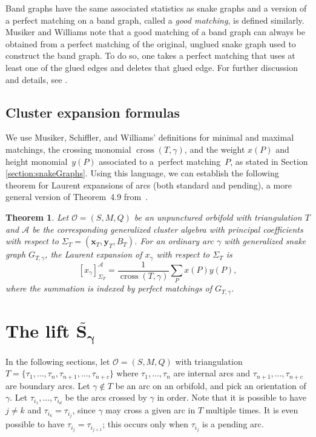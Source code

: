 \documentclass[11pt]{article}
\numberwithin{equation}{section}
\newtheorem{Theorem}{Theorem}[section]
\begin{document}
Band graphs have the same associated statistics as snake graphs and a version of a perfect matching on a band graph, called a \emph{good matching}, is defined similarly. Musiker and Williams note that a good matching of a band graph can always be obtained from a perfect matching of the original, unglued snake graph used to construct the band graph. To do so, one takes a perfect matching that uses at least one of the glued edges and deletes that glued edge. For further discussion and details, see \cite[Section~3]{MW}.

\subsection{Cluster expansion formulas}

We use Musiker, Schiffler, and Williams' definitions for minimal and maximal matchings, the crossing monomial $\operatorname{cross}(T,\gamma)$, and the weight $x(P)$ and height monomial~$y(P)$ associated to a~perfect matching~$P$, as stated in Section \ref{section:snakeGraphs}. Using this language, we can establish the following theorem for Laurent expansions of arcs (both standard and pending), a more general version of Theorem~4.9 from~\cite{MSW}.

\begin{Theorem}\label{Thm:GenSnake+}
Let $\mathcal{O} = (S,M,Q)$ be an unpunctured orbifold with triangulation $T$ and $\mathcal{A}$ be the corresponding generalized cluster algebra with principal coefficients with respect to $\Sigma_T = (\mathbf{x}_T,\mathbf{y}_T,B_T)$. For an ordinary arc $\gamma$ with generalized snake graph $G_{T,\gamma}$, the Laurent expansion of $x_\gamma$ with respect to $\Sigma_T$ is
\[ [x_\gamma]^{\mathcal{A}}_{\Sigma_T} = \frac{1}{\operatorname{cross}(T,\gamma)} \sum_P x(P)y(P), \]
where the summation is indexed by perfect matchings of $G_{T,\gamma}$.
\end{Theorem}

\setcounter{section}{4}
\setcounter{subsection}{3}
\setcounter{subsubsection}{0}
\setcounter{Theorem}{5}
\setcounter{equation}{0}
\section[The lift $\widetilde{S_\gamma}$]{The lift $\boldsymbol{\widetilde{S_\gamma}}$}\label{sec:lift}

In the following sections, let $\mathcal{O} = (S,M,Q)$ with triangulation $T = \{ \tau_1,\ldots, \tau_n, \tau_{n+1},\ldots, \tau_{n+c}\}$ where $\tau_1,\ldots, \tau_n$ are internal arcs and $\tau_{n+1},\ldots, \tau_{n+c}$ are boundary arcs. Let $\gamma \notin T$ be an arc on an orbifold, and pick an orientation of $\gamma$. Let $\tau_{i_1},\ldots, \tau_{i_d}$ be the arcs crossed by $\gamma$ in order. Note that it is possible to have $j \neq k$ and $\tau_{i_k} = \tau_{i_j}$, since $\gamma$ may cross a given arc in $T$ multiple times. It is even possible to have $\tau_{i_j} = \tau_{i_{j+1}}$; this occurs only when $\tau_{i_j}$ is a pending arc.
\end{document}
